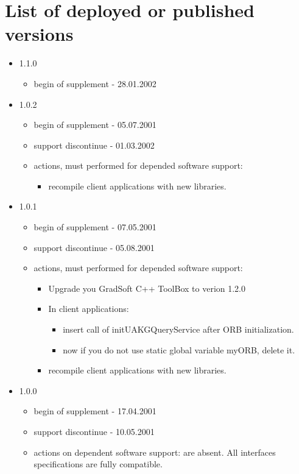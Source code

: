 \documentclass[10pt]{article}
\begin{document}
\section{ List of deployed or published versions }

 \begin{itemize}
  \item 1.1.0
  \begin{itemize}
   \item begin of supplement - 28.01.2002
  \end{itemize}
  \item 1.0.2
  \begin{itemize}
   \item begin of supplement - 05.07.2001
   \item support discontinue - 01.03.2002 
   \item actions, must performed for depended software support: 
   \begin{itemize}
     \item recompile client applications with new libraries.
   \end{itemize}
  \end{itemize}
  \item 1.0.1
  \begin{itemize}
   \item begin of supplement - 07.05.2001
   \item support discontinue - 05.08.2001 
   \item actions, must performed for depended software support: 
   \begin{itemize}
     \item Upgrade you GradSoft C++ ToolBox to verion 1.2.0
     \item In client applications:
     \begin{itemize}
       \item insert call of initUAKGQueryService after ORB initialization.
       \item now if you do not use static global variable myORB, delete it.
     \end{itemize}
     \item recompile client applications with new libraries.
   \end{itemize}
  \end{itemize}
  \item 1.0.0
  \begin{itemize}
   \item begin of supplement - 17.04.2001
   \item support discontinue - 10.05.2001 
   \item actions on dependent software support: are absent. All interfaces specifications are fully compatible.
  \end{itemize}
 \end{itemize}
\end{document}
